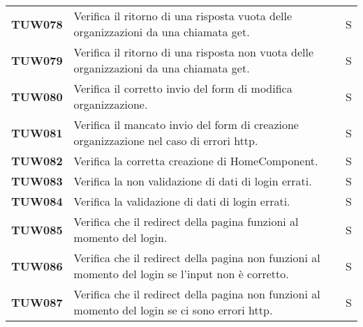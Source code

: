 \documentclass[../../piano-di-qualifica.tex]{subfiles}
\begin{document}
\begin{longtable}[H]{>{\centering\bfseries}m{3cm} >{}m{10cm} >{\centering\arraybackslash}m{3cm}}
  TUW078             & Verifica il ritorno di una risposta vuota delle organizzazioni da una chiamata get.                                 & S                             \\

  TUW079             & Verifica il ritorno di una risposta non vuota delle organizzazioni da una chiamata get.                             & S                             \\

  TUW080             & Verifica il corretto invio del form di modifica organizzazione.                                                     & S                             \\

  TUW081             & Verifica il mancato invio del form di creazione organizzazione nel caso di errori http.                             & S                             \\




  TUW082             & Verifica la corretta creazione di HomeComponent.                                                                    & S                             \\

  TUW083             & Verifica la non validazione di dati di login errati.                                                                & S                             \\

  TUW084             & Verifica la validazione di dati di login errati.                                                                    & S                             \\

  TUW085             & Verifica che il redirect della pagina funzioni al momento del login.                                                & S                             \\

  TUW086             & Verifica che il redirect della pagina non funzioni al momento del login se l'input non è corretto.                  & S                             \\

  TUW087             & Verifica che il redirect della pagina non funzioni al momento del login se ci sono errori http.                     & S                             \\


\end{longtable}
\end{document}
